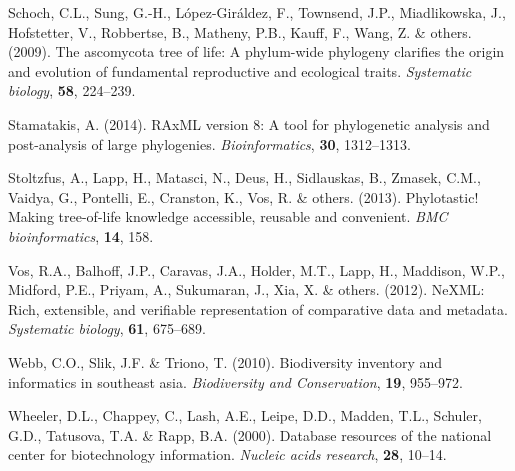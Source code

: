 \documentclass[]{article}
\begin{document}
\leavevmode\hypertarget{ref-schoch2009ascomycota}{}%
Schoch, C.L., Sung, G.-H., López-Giráldez, F., Townsend, J.P., Miadlikowska, J., Hofstetter, V., Robbertse, B., Matheny, P.B., Kauff, F., Wang, Z. \& others. (2009). The ascomycota tree of life: A phylum-wide phylogeny clarifies the origin and evolution of fundamental reproductive and ecological traits. \emph{Systematic biology}, \textbf{58}, 224--239.

\leavevmode\hypertarget{ref-stamatakis2014raxml}{}%
Stamatakis, A. (2014). RAxML version 8: A tool for phylogenetic analysis and post-analysis of large phylogenies. \emph{Bioinformatics}, \textbf{30}, 1312--1313.

\leavevmode\hypertarget{ref-stoltzfus2013phylotastic}{}%
Stoltzfus, A., Lapp, H., Matasci, N., Deus, H., Sidlauskas, B., Zmasek, C.M., Vaidya, G., Pontelli, E., Cranston, K., Vos, R. \& others. (2013). Phylotastic! Making tree-of-life knowledge accessible, reusable and convenient. \emph{BMC bioinformatics}, \textbf{14}, 158.

\leavevmode\hypertarget{ref-vos2012nexml}{}%
Vos, R.A., Balhoff, J.P., Caravas, J.A., Holder, M.T., Lapp, H., Maddison, W.P., Midford, P.E., Priyam, A., Sukumaran, J., Xia, X. \& others. (2012). NeXML: Rich, extensible, and verifiable representation of comparative data and metadata. \emph{Systematic biology}, \textbf{61}, 675--689.

\leavevmode\hypertarget{ref-webb2010biodiversity}{}%
Webb, C.O., Slik, J.F. \& Triono, T. (2010). Biodiversity inventory and informatics in southeast asia. \emph{Biodiversity and Conservation}, \textbf{19}, 955--972.

\leavevmode\hypertarget{ref-wheeler2000database}{}%
Wheeler, D.L., Chappey, C., Lash, A.E., Leipe, D.D., Madden, T.L., Schuler, G.D., Tatusova, T.A. \& Rapp, B.A. (2000). Database resources of the national center for biotechnology information. \emph{Nucleic acids research}, \textbf{28}, 10--14.
\end{document}
